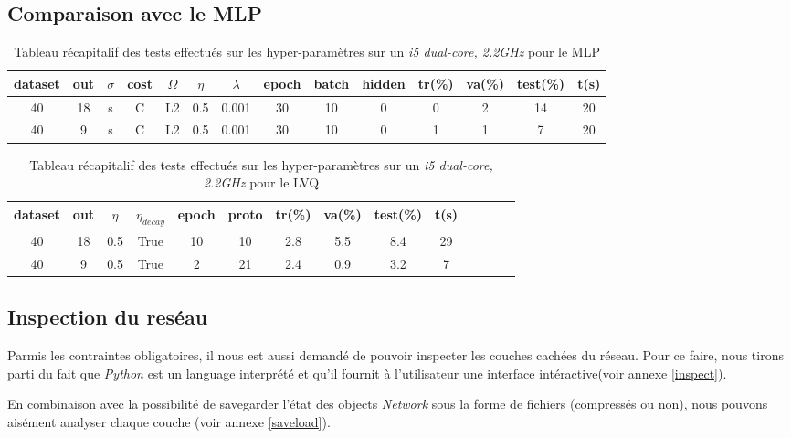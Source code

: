 \documentclass[11pt]{article}
\begin{document}
\subsection{Comparaison avec le MLP}
\begin{table}[h]
	\centering
	\begin{tabular}{|c|c|c|c|c|c|c|c|c|c|c|c|c|c|}
		\hline
		dataset & out & $\sigma$  & cost & $\Omega$ & $\eta$ & $\lambda$ &
			epoch  & batch & hidden & tr(\%) & va(\%) & test(\%) & t(s)\\
		\hline		
		40	& 18 & s & C & L2 & 0.5 & 0.001 & 30 & 10 & 0 & 0 & 2 & 14 & 20 \\
		\hline
		40	& 9 & s & C & L2 & 0.5 & 0.001 & 30 & 10 & 0 & 1 & 1 & 7 & 20 \\
		\hline
\end{tabular}
  \caption{Tableau r\'ecapitalif des tests effectu\'es sur les
	hyper-param\`etres sur un {\em i5 dual-core, 2.2GHz} pour le MLP }
\end{table}
\begin{table}[h]
	\centering
	\begin{tabular}{|c|c|c|c|c|c|c|c|c|c|c|c|c|c|}
		\hline
		dataset & out  & $\eta$ & $\eta_{decay}$ & epoch  & proto  & tr(\%) & va(\%) & test(\%) & t(s)\\
		\hline		
		40	& 18 & 0.5 & True & 10 & 10 & 2.8 & 5.5 & 8.4 & 29\\
		\hline
		40	& 9 & 0.5 & True & 2 & 21 & 2.4 & 0.9 & 3.2 & 7\\
		\hline
\end{tabular}
  \caption{Tableau r\'ecapitalif des tests effectu\'es sur les
	hyper-param\`etres sur un {\em i5 dual-core, 2.2GHz} pour le LVQ }
\end{table}


\newpage
\subsection{Inspection du res\'eau}
Parmis les contraintes obligatoires, il nous est aussi demand\'e de pouvoir
inspecter les couches cach\'ees du r\'eseau. Pour ce faire, nous tirons parti du
fait que {\em Python} est un language interpr\'et\'e et qu'il fournit \`a
l'utilisateur une interface int\'eractive(voir annexe \ref{inspect}).

En combinaison avec la possibilit\'e de savegarder l'\'etat des
objects {\em Network} sous la forme de fichiers (compress\'es ou non), nous
pouvons ais\'ement analyser chaque couche (voir annexe \ref{saveload}).
\end{document}
